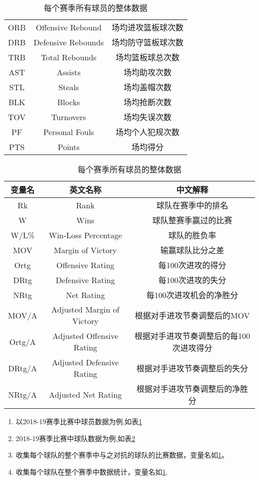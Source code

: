 \begin{table}[h!]
\begin{center}
\begin{tabular}{ |c|c|c| }
\\
			ORB	&Offensive Rebound	&场均进攻篮板球次数
\\
			DRB&	Defensive Rebounds	&场均防守篮板球次数
\\
			TRB	&Total Rebounds	&场均篮板球总次数
\\
			AST&	Assists	&场均助攻次数
\\
			STL	&Steals	&场均盖帽次数
\\
			BLK	&Blocks	&场均抢断次数
\\
			TOV	&Turnovers	&场均失误次数
\\
			PF&	Personal Fouls	&场均个人犯规次数
\\
			PTS&	Points	&场均得分
\\
			\hline
		\end{tabular}
		\caption{每个赛季所有球员的整体数据}
		\label{tab:1}
	\end{center}
\end{table}


\begin{table}[t]
	\centering
	\begin{tabular}{|c|c|c|}
		\hline
		变量名	&英文名称&	中文解释
\\
		\hline
		Rk&	Rank&	球队在赛季中的排名
\\
		W&	Wins&	球队整赛季赢过的比赛
\\
		W/L\%&	Win-Loss Percentage&	球队的胜负率
\\
		MOV	&Margin of Victory&	输赢球队比分之差
\\
		Ortg	&Offensive Rating&	每100次进攻的得分
\\
		DRtg&	Defensive Rating&	每100次进攻的失分
\\
		NRtg&	Net Rating&	每100次进攻机会的净胜分
\\
		MOV/A&	Adjusted Margin of Victory&	根据对手进攻节奏调整后的MOV
\\
		Ortg/A	&Adjusted Offensive Rating&	根据对手进攻节奏调整后的每100次进攻得分
\\
		DRtg/A&	Adjusted Defensive Rating	&根据对手进攻节奏调整后的失分
\\
		NRtg/A&	Adjusted Net Rating	&根据对手进攻节奏调整后的净胜分
\\
		\hline
	\end{tabular}
	\caption {每个赛季所有球员的整体数据}
	\label{2}
	
\end{table}


\begin{enumerate}
	\item  以2018-19赛季比赛中球员数据为例,如表\ref{tab:1}
	\item 2018-19赛季比赛中球队数据为例,如表\ref{2}
	\item 收集每个球队的整个赛季中与之对抗的球队的比赛数据，变量名如\ref{tab:1}。
	\item 收集每个球队在整个赛季中数据统计，变量名如\ref{tab:1}.

\end{enumerate}





